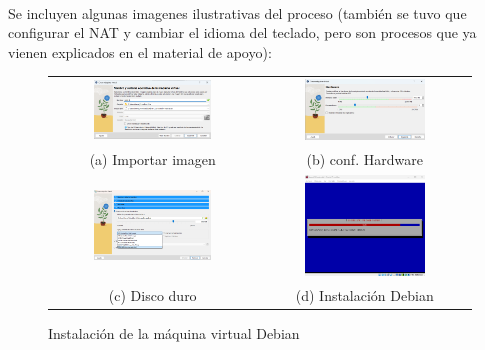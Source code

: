 \documentclass{article}
\begin{document}
\\

Se incluyen algunas imagenes ilustrativas del proceso (también se tuvo que configurar el NAT y cambiar el idioma del teclado, pero son procesos que ya vienen explicados en el material de apoyo):

\begin{figure}[H]
    \centering
    \begin{tabular}{c c}  %
    \includegraphics[width=0.6\textwidth]{instalacion_maq_1.png} & 
    \includegraphics[width=0.6\textwidth]{instalacion_maq_2.png} \\
    (a) Importar imagen & (b) conf. Hardware \\
    \includegraphics[width=0.6\textwidth]{instalacion_maq_3.png} & 
    \includegraphics[width=0.6\textwidth]{instalacion_maq_4.png} \\
    (c) Disco duro & (d) Instalación Debian
    \end{tabular}
    \caption{Instalación de la máquina virtual Debian}
    \label{fig:instalación máquina virtual}
\end{figure}
\end{document}
